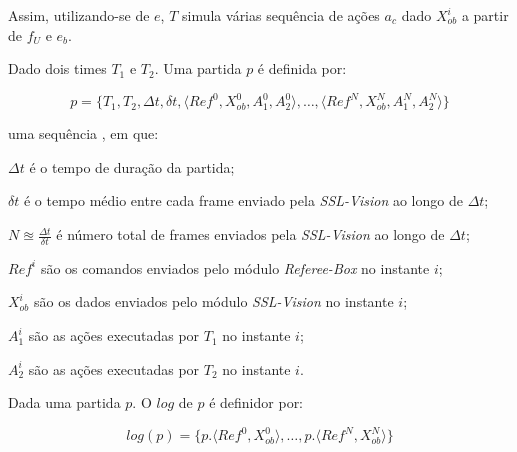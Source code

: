   Assim, utilizando-se de $e$, $T$ simula várias sequência de ações $a_c$ dado $X_{ob}^{i}$
  a partir de $f_{U}$ e $e_b$.

\begin{defi}[Partida]
  Dado dois times $T_1$ e $T_2$. Uma partida $p$ é definida por:

  \[
   p = \lbrace T_1, T_2, \Delta t, \delta t, \langle Ref^{0}, X_{ob}^{0}, A_1^{0}, A_2^{0}\rangle, 
    \dots, \langle Ref^{N}, X_{ob}^{N}, A_1^{N}, A_2^{N} \rangle \rbrace
 \]

  uma sequência , em que:
  \begin{description}
    \item $\Delta t$ é o tempo de duração da partida;
    \item $\delta t$ é o tempo médio entre cada frame enviado pela \textit{SSL-Vision} ao longo de $\Delta t$;
    \item $N \approxeq \frac{\Delta t}{\delta t}$ é número total de frames enviados pela \textit{SSL-Vision}
  ao longo de $\Delta t$;
    \item $Ref^{i}$ são os comandos enviados pelo módulo \textit{Referee-Box} no instante $i$;
    \item $X_{ob}^{i}$ são os dados enviados pelo módulo \textit{SSL-Vision} no instante $i$;
    \item $A_1^{i}$ são as ações executadas por $T_1$ no instante $i$;
    \item $A_2^{i}$ são as ações executadas por $T_2$ no instante $i$.
  \end{description}
\end{defi}

\begin{defi}[Logs]
  Dada uma partida $p$. O $log$ de $p$ é definidor por:

  \[
    log(p) = \lbrace p.\langle Ref^{0}, X_{ob}^{0}\rangle, \dots, p.\langle Ref^{N}, X_{ob}^{N}\rangle \rbrace
  \]
\end{defi}
